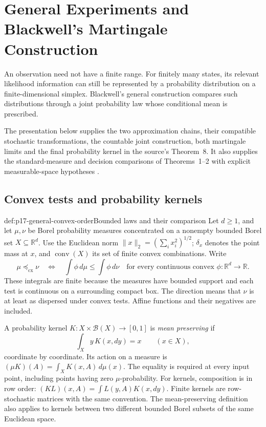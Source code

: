 \chapter{General Experiments and Blackwell's Martingale Construction}
\label{sec:p17-general-blackwell-comparison}

An observation need not have a finite range. For finitely many states,
its relevant likelihood information can still be represented by a
probability distribution on a finite-dimensional simplex. Blackwell's
general construction compares such distributions through a joint
probability law whose conditional mean is prescribed.

The presentation below supplies the two approximation chains, their
compatible stochastic transformations, the countable joint construction,
both martingale limits and the final probability kernel in the source's
Theorem~8. It also supplies the standard-measure and decision comparisons
of Theorems~1--2 with explicit measurable-space hypotheses
\cite[pp.~265--269]{Blackwell1953EquivalentExperiments}.

\section{Convex tests and probability kernels}
\label{sec:p17-general-convex-tests}

\begin{hbdefinition}{def:p17-general-convex-order}{Bounded laws and their comparison}
Let \(d\geq1\), and let \(\mu,\nu\) be Borel probability measures
concentrated on a nonempty bounded Borel set \(X\subseteq\mathbb R^d\).
Use the Euclidean norm \(\|x\|_2=(\sum_i x_i^2)^{1/2}\);
\(\delta_x\) denotes the point mass at \(x\), and
\(\operatorname{conv}(X)\) its set of finite convex combinations.
Write
\[
 \mu\preceq_{\mathrm{cx}}\nu
 \quad\Longleftrightarrow\quad
 \int\phi\,d\mu\leq\int\phi\,d\nu
       \quad\text{for every continuous convex }
                         \phi:\mathbb R^d\to\mathbb R.
\]
These integrals are finite because the measures have bounded support
and each test is continuous on a surrounding compact box.
The direction means that \(\nu\) is at least as dispersed under convex
tests. Affine functions and their negatives are included.

A probability kernel \(K:X\times\mathcal B(X)\to[0,1]\) is
\emph{mean preserving} if
\[
                     \int_X y\,K(x,dy)=x\qquad(x\in X),
\]
coordinate by coordinate. Its action on a measure is
\((\mu K)(A)=\int_XK(x,A)\,d\mu(x)\).
The equality is required at every input point, including points
having zero \(\mu\)-probability.
For kernels, composition is in row order:
\((KL)(x,A)=\int L(y,A)K(x,dy)\).
Finite kernels are row-stochastic matrices with the same convention.
The mean-preserving definition also applies to kernels between two
different bounded Borel subsets of the same Euclidean space.
\end{hbdefinition}

